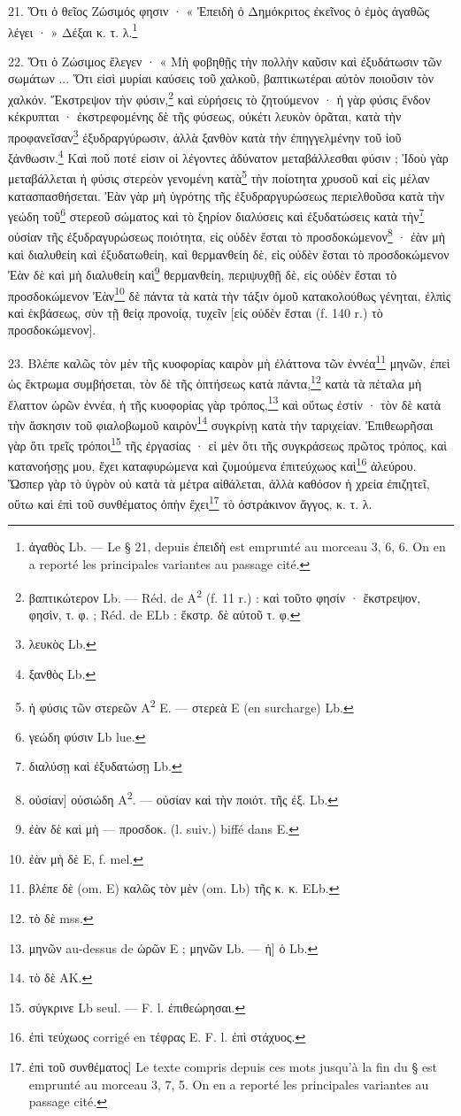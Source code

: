 \documentclass[landscape, a4paper, 11pt, oneside, polutonikogreek, french]{article}
\begin{document}
21. Ὅτι ὁ θεῖος Ζώσιμός φησιν · « Ἐπειδὴ ὁ Δημόκριτος ἐκεῖνος ὁ ἐμὸς ἀγαθῶς λέγει · » Δέξαι κ. τ. λ.\footnote{ἀγαθὸς Lb. --- Le § 21, depuis ἐπειδὴ est emprunté au morceau 3, 6, 6. On en a reporté les principales variantes au passage cité.}

22. Ὅτι ὁ Ζώσιμος ἔλεγεν · « Μὴ φοβηθῇς τὴν πολλὴν καῦσιν καὶ ἐξυδάτωσιν τῶν σωμάτων ... Ὅτι εἰσὶ μυρίαι καύσεις τοῦ χαλκοῦ, βαπτικωτέραι αὐτὸν ποιοῦσιν τὸν χαλκόν. Ἔκστρεψον τὴν φύσιν,\footnote{βαπτικώτερον Lb. --- Réd. de A\textsuperscript{2} (f. 11 r.) : καὶ τοῦτο φησίν · ἔκστρεψον, φησὶν, τ. φ. ; Réd. de ELb : ἔκστρ. δὲ αὐτοῦ τ. φ.} καὶ εὑρήσεις τὸ ζητούμενον · ἡ γὰρ φύσις ἔνδον κέκρυπται · ἐκστρεφομένης δὲ τῆς φύσεως, οὐκέτι λευκὸν ὁρᾶται, κατὰ τὴν προφανεῖσαν\footnote{λευκὸς Lb.} ἐξυδραργύρωσιν, ἀλλὰ ξανθὸν κατὰ τὴν ἐπηγγελμένην τοῦ ἰοῦ ξάνθωσιν.\footnote{ξανθὸς Lb.} Καὶ ποῦ ποτέ εἰσιν οἱ λέγοντες ἀδύνατον μεταβάλλεσθαι φύσιν ; Ἰδοὺ γὰρ μεταβάλλεται ἡ φύσις στερεὸν γενομένη κατὰ\footnote{ἡ φύσις τῶν στερεῶν A\textsuperscript{2} E. --- στερεὰ E (en surcharge) Lb.} τὴν ποίοτητα χρυσοῦ καὶ εἰς μέλαν κατασπασθήσεται. Ἐὰν γὰρ μὴ ὑγρότης τῆς ἐξυδραργυρώσεως περιελθοῦσα κατὰ τὴν γεώδη τοῦ\footnote{γεώδη φύσιν Lb lue.} στερεοῦ σώματος καὶ τὸ ξηρίον διαλύσεις καὶ ἐξυδατώσεις κατὰ τὴν\footnote{διαλύσῃ καὶ ἐξυδατώσῃ Lb.} οὐσίαν τῆς ἐξυδραγυρώσεως ποιότητα, εἰς οὐδὲν ἔσται τὸ προσδοκώμενον\footnote{οὐσίαν] οὐσιώδη A\textsuperscript{2}. --- οὐσίαν καὶ τὴν ποιότ. τῆς ἐξ. Lb.} · ἐὰν μὴ καὶ διαλυθείη καὶ ἐξυδατωθείη, καὶ θερμανθείη δὲ, εἰς οὐδὲν ἔσται τὸ προσδοκώμενον Ἐὰν δὲ καὶ μὴ διαλυθείη καὶ\footnote{ἐὰν δὲ καὶ μὴ --- προσδοκ. (l. suiv.) biffé dans E.} θερμανθείη, περιψυχθῇ δὲ, εἰς οὐδὲν ἔσται τὸ προσδοκώμενον Ἐὰν\footnote{ἐὰν μὴ δὲ E, f. mel.} δὲ πάντα τὰ κατὰ τὴν τάξιν ὁμοῦ κατακολούθως γένηται, ἐλπὶς καὶ ἑκβάσεως, σὺν τῇ θείᾳ προνοίᾳ, τυχεῖν [εἰς οὐδὲν ἔσται (f. 140 r.) τὸ προσδοκώμενον].

23. Βλέπε καλῶς τὸν μὲν τῆς κυοφορίας καιρὸν μὴ ἐλάττονα τῶν ἐννέα\footnote{βλέπε δὲ (om. E) καλῶς τὸν μὲν (om. Lb) τῆς κ. κ. ELb.} μηνῶν, ἐπεὶ ὡς ἔκτρωμα συμβήσεται, τὸν δὲ τῆς ὁπτήσεως κατὰ πάντα,\footnote{τὸ δὲ mss.} κατὰ τὰ πέταλα μὴ ἔλαττον ὡρῶν ἐννέα, ἡ τῆς κυοφορίας γὰρ τρόπος,\footnote{μηνῶν au-dessus de ὡρῶν E ; μηνῶν Lb. --- ἡ] ὁ Lb.} καὶ οὕτως ἐστίν · τὸν δὲ κατὰ τὴν ἄσκησιν τοῦ φιαλοβωμοῦ καιρὸν\footnote{τὸ δὲ AK.} συγκρίνῃ κατὰ τὴν ταριχείαν. Ἐπιθεωρῆσαι γὰρ ὅτι τρεῖς τρόποι\footnote{σύγκρινε Lb seul. --- F. l. ἐπιθεώρησαι.} τῆς ἐργασίας · εἰ μὲν ὅτι τῆς συγκράσεως πρῶτος τρόπος, καὶ κατανοήσῃς μου, ἔχει καταφυρώμενα καὶ ζυμούμενα ἐπιτεύχωος καὶ\footnote{ἐπὶ τεύχωος corrigé en τέφρας E. F. l. ἐπὶ στάχυος.} ἀλεύρου. Ὥσπερ γὰρ τὸ ὑγρὸν οὐ κατὰ τὰ μέτρα αἰθάλεται, ἀλλὰ καθόσον ἡ χρεία ἐπιζητεῖ, οὕτω καὶ ἐπὶ τοῦ συνθέματος ὀπὴν ἔχει\footnote{ἐπὶ τοῦ συνθέματος] Le texte compris depuis ces mots jusqu'à la fin du § est emprunté au morceau 3, 7, 5. On en a reporté les principales variantes au passage cité.} τὸ ὀστράκινον ἄγγος, κ. τ. λ.
\end{document}
